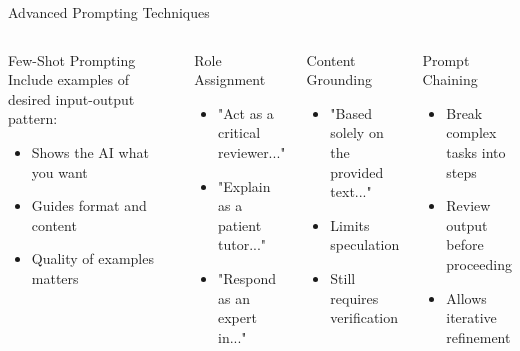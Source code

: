 \documentclass{beamer}
\begin{document}
\begin{frame}{Advanced Prompting Techniques}
\begin{columns}
\begin{block}{Few-Shot Prompting}
Include examples of desired input-output pattern:
\begin{itemize}
  \item Shows the AI what you want
  \item Guides format and content
  \item Quality of examples matters
\end{itemize}
\end{block}

\pause

\begin{block}{Role Assignment}
\begin{itemize}
  \item "Act as a critical reviewer..."
  \item "Explain as a patient tutor..."
  \item "Respond as an expert in..."
\end{itemize}
\end{block}

\pause

\begin{block}{Content Grounding}
\begin{itemize}
  \item "Based solely on the provided text..."
  \item Limits speculation
  \item Still requires verification
\end{itemize}
\end{block}

\pause

\begin{block}{Prompt Chaining}
\begin{itemize}
  \item Break complex tasks into steps
  \item Review output before proceeding
  \item Allows iterative refinement
\end{itemize}
\end{block}
\end{columns}

\end{frame}



\end{document}
